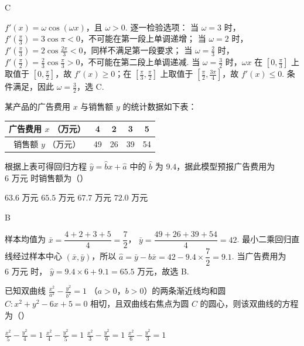 \begin{answer}
C
\end{answer}

\begin{solution}
\(f'(x)=\omega\cos(\omega x)\)，且 \(\omega>0\). 逐一检验选项：
当 \(\omega=3\) 时，\(f'(\frac{\pi}{3})=3\cos\pi<0\)，不可能在第一段上单调递增；
当 \(\omega=2\) 时，\(f'(\frac{\pi}{3})=2\cos\frac{2\pi}{3}<0\)，同样不满足第一段要求；
当 \(\omega=\frac23\) 时，\(f'(\frac{\pi}{2})=\frac23\cos\frac{\pi}{3}>0\)，不可能在第二段上单调递减.
当 \(\omega=\frac32\) 时，\(\omega x\) 在 \([0,\frac{\pi}{3}]\) 上取值于 \([0,\frac\pi2]\)，故 \(f'(x)\geqslant0\)；在 \([\frac\pi3,\frac\pi2]\) 上取值于 \([\frac\pi2,\frac{3\pi}4]\)，故 \(f'(x)\leqslant0\). 条件满足，因此 \(\omega=\frac32\)，选 C.
\end{solution}

\begin{problem}
某产品的广告费用 \(x\) 与销售额 \(y\) 的统计数据如下表：

\begin{center}
\begin{tabular}{c|cccc}
广告费用 \(x\) （万元） & 4 & 2 & 3 & 5 \\
\hline
销售额 \(y\) （万元） & 49 & 26 & 39 & 54
\end{tabular}
\end{center}

根据上表可得回归方程 \( \hat{y} = \hat{b}x + \hat{a} \) 中的 \(\hat{b}\) 为 \(9.4\)，据此模型预报广告费用为 \(6\text{ 万元}\) 时销售额为（\quad）

\choices
    {\(63.6\text{ 万元}\)}
    {\(65.5\text{ 万元}\)}
    {\(67.7\text{ 万元}\)}
    {\(72.0\text{ 万元}\)}
\end{problem}

\begin{answer}
B
\end{answer}

\begin{solution}
样本均值为 \(\bar{x}=\dfrac{4+2+3+5}{4}=\dfrac72\)，
\(\bar{y}=\dfrac{49+26+39+54}{4}=42\). 最小二乘回归直线经过样本中心 \((\bar{x},\bar{y})\)，所以
\(\hat a=\bar y-\hat b\bar x=42-9.4\times\dfrac72=9.1\).
当广告费用为 \(6\text{ 万元}\) 时，
\(\hat y=9.4\times6+9.1=65.5\text{ 万元}\)，故选 B.
\end{solution}

\begin{problem}
已知双曲线 \(\frac{x^2}{a^2} - \frac{y^2}{b^2} = 1 \) （\(a > 0\)，\(b > 0\)）的两条渐近线均和圆 \(C: x^2 + y^2 - 6x + 5 = 0\) 相切，且双曲线右焦点为圆 \(C\) 的圆心，则该双曲线的方程为（\quad）

\choices
    {\(\frac{x^2}{5} -\frac{y^2}{4} = 1\)}
    {\(\frac{x^2}{4} -\frac{y^2}{5} = 1\)}
    {\(\frac{x^2}{3} -\frac{y^2}{6} = 1\)}
    {\(\frac{x^2}{6} -\frac{y^2}{3} = 1\)}
\end{problem}

